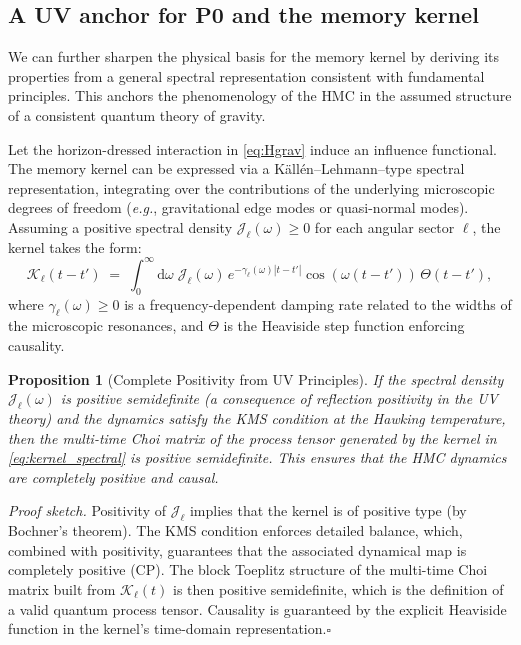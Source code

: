 \documentclass[aps,prd,preprint,onecolumn,superscriptaddress,nofootinbib,longbibliography,floatfix,11pt,showpacs,showkeys]{revtex4-2}
\newcommand{\eg}{\textit{e.g.}\xspace}
\newcommand{\HMC}{\textsc{HMC}\xspace}
\theoremstyle{plain}
\newtheorem{proposition}[theorem]{Proposition}
\theoremstyle{definition}
\theoremstyle{remark}
\begin{document}
\subsection{A UV anchor for \texorpdfstring{P0}{P0} and the memory kernel}
\label{ssec:uv-anchor}
We can further sharpen the physical basis for the memory kernel by deriving its properties from a general spectral representation consistent with fundamental principles. This anchors the phenomenology of the \HMC{} in the assumed structure of a consistent quantum theory of gravity.

Let the horizon-dressed interaction in \eqref{eq:Hgrav} induce an influence functional. The memory kernel can be expressed via a K\"all\'en--Lehmann--type spectral representation, integrating over the contributions of the underlying microscopic degrees of freedom (\eg, gravitational edge modes or quasi-normal modes). Assuming a positive spectral density $\mathcal{J}_\ell(\omega)\ge 0$ for each angular sector $\ell$, the kernel takes the form:
\begin{equation}
\mathcal{K}_\ell(t-t')\;=\;\int_0^\infty\! \mathrm{d}\omega\; \mathcal{J}_\ell(\omega)\, e^{-\gamma_\ell(\omega) |t-t'|}\cos(\omega (t-t'))\,\Theta(t-t'),
\label{eq:kernel_spectral}
\end{equation}
where $\gamma_\ell(\omega)\ge 0$ is a frequency-dependent damping rate related to the widths of the microscopic resonances, and $\Theta$ is the Heaviside step function enforcing causality.

\begin{proposition}[Complete Positivity from UV Principles]
\label{prop:uv-kernel}
If the spectral density $\mathcal{J}_\ell(\omega)$ is positive semidefinite (a consequence of reflection positivity in the UV theory) and the dynamics satisfy the KMS condition at the Hawking temperature, then the multi-time Choi matrix of the process tensor generated by the kernel in \eqref{eq:kernel_spectral} is positive semidefinite. This ensures that the \HMC{} dynamics are completely positive and causal.
\end{proposition}

\textit{Proof sketch.} Positivity of $\mathcal{J}_\ell$ implies that the kernel is of positive type (by Bochner's theorem). The KMS condition enforces detailed balance, which, combined with positivity, guarantees that the associated dynamical map is completely positive (CP). The block Toeplitz structure of the multi-time Choi matrix built from $\mathcal{K}_\ell(t)$ is then positive semidefinite, which is the definition of a valid quantum process tensor. Causality is guaranteed by the explicit Heaviside function in the kernel's time-domain representation.\hfill$\square$
\end{document}
